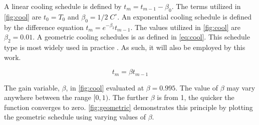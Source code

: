 \documentclass[ee,thesis]{usuthesis}
\newcommand{\Tau}{T}                        %
\begin{document}
A linear cooling schedule is defined by \(t_m = t_{m-1} - \beta_0\). The terms utilized in \ref{fig:cool} are \(t_0 = \Tau_0\)
and \(\beta_0 = 1/2\; C^\circ\). An exponential cooling schedule is defined by the difference equation \(t_m = e^{-\beta_2}t_{m-1}\).
The values utilized in \ref{fig:cool} are \(\beta_2 = 0.01\). A geometric cooling schedules is as defined in \ref{eq:cool}. This
schedule type is most widely used in practice \cite{keller-2019-multi-objec}. As such, it will also be employed by this
work.

\begin{equation}
\label{eq:cool}
t_m = \beta t_{m-1}
\end{equation}

The gain variable, \(\beta\), in \ref{fig:cool} evaluated at \(\beta = 0.995\). The value of \(\beta\) may vary anywhere between the range
\([0,1)\). The further \(\beta\) is from 1, the quicker the function converges to zero. \ref{fig:geometric} demonstrates this
principle by plotting the geometric schedule using varying values of \(\beta\).
\end{document}
